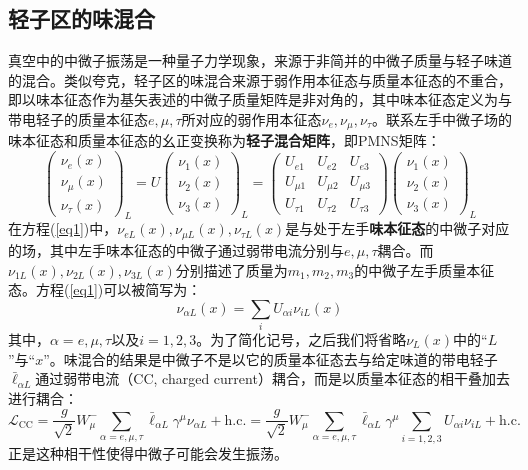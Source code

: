 \documentclass{article}
\begin{document}
	\subsection{轻子区的味混合}
	真空中的中微子振荡是一种量子力学现象\cite{Pontecorvo1957}\cite{Pontecorvo1958b}\cite{Pontecorvo1967}，来源于非简并的中微子质量与轻子味道的混合\cite{Maki1962}\cite{Pontecorvo1967}。类似夸克，轻子区的味混合来源于弱作用本征态与质量本征态的不重合，即以味本征态作为基矢表述的中微子质量矩阵是非对角的，其中味本征态定义为与带电轻子的质量本征态$e,\mu,\tau$所对应的弱作用本征态$\nu_e,\nu_\mu,\nu_\tau$。联系左手中微子场的味本征态和质量本征态的幺正变换称为\textbf{轻子混合矩阵}，即PMNS矩阵：
	\begin{equation}
		\begin{pmatrix}\nu_e(x)\\\nu_\mu(x)\\\nu_\tau(x)\end{pmatrix}_L=U\begin{pmatrix}\nu_1(x)\\\nu_2(x)\\\nu_3(x)\end{pmatrix}_L=\begin{pmatrix}U_{e1}&U_{e2}&U_{e3}\\U_{\mu1}&U_{\mu2}&U_{\mu3}\\U_{\tau1}&U_{\tau2}&U_{\tau3}\end{pmatrix}\begin{pmatrix}\nu_1(x)\\\nu_2(x)\\\nu_3(x)\end{pmatrix}_L
		\label{eq1}
	\end{equation}
	在方程(\ref{eq1})中，$\nu_{eL}(x),\nu_{\mu L}(x),\nu_{\tau L}(x)$是与处于左手\textbf{味本征态}的中微子对应的场，其中左手味本征态的中微子通过弱带电流分别与$e,\mu,\tau$耦合。而$\nu_{1L}(x),\nu_{2L}(x),\nu_{3L}(x)$分别描述了质量为$m_1,m_2,m_3$的中微子左手质量本征态。方程(\ref{eq1})可以被简写为：
	\begin{equation}
		\nu_{\alpha L}(x)=\sum_i U_{\alpha i}\nu_{iL}(x)
		\label{eq2}
	\end{equation}
	其中，$\alpha=e,\mu,\tau$以及$i=1,2,3$。为了简化记号，之后我们将省略$\nu_L(x)$中的“$L$”与“$x$”。味混合的结果是中微子不是以它的质量本征态去与给定味道的带电轻子$\bar{\ell}_{\alpha L}$通过弱带电流（CC, charged current）耦合，而是以质量本征态的相干叠加去进行耦合：
	\begin{equation}
		\mathcal{L}_{\mathrm{CC}}=\frac{g}{\sqrt{2}}W_{\mu}^{-}\sum_{\alpha=e,\mu,\tau}\bar{\ell}_{\alpha L}\gamma^{\mu}\nu_{\alpha L}+\mathrm{h.c.}=\frac{g}{\sqrt{2}}W_{\mu}^{-}\sum_{\alpha=e,\mu,\tau}\bar{\ell}_{\alpha L}\gamma^{\mu}\sum_{i=1,2,3}U_{\alpha i}\nu_{iL}+\mathrm{h.c.}
		\label{eq3}
	\end{equation}
	正是这种相干性使得中微子可能会发生振荡。
	
\end{document}
